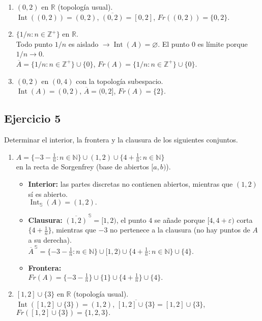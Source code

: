 \documentclass[12pt]{article}
\begin{document}
\begin{enumerate}
\item $(0,2)$ en $\mathbb{R}$ (topología usual).\\[4pt]
$\operatorname{Int}((0,2)) = (0,2)$, \quad 
$\overline{(0,2)} = [0,2]$, \quad 
$Fr((0,2)) = \{0,2\}.$

\item $\{1/n : n \in \mathbb{Z}^+\}$ en $\mathbb{R}$.\\[4pt]
Todo punto $1/n$ es aislado $\rightarrow \operatorname{Int}(A) = \varnothing$. 
El punto $0$ es límite porque $1/n \to 0$.\\
$\overline{A} = \{1/n : n \in \mathbb{Z}^+\} \cup \{0\}$, \quad
$Fr(A) = \{1/n : n \in \mathbb{Z}^+\} \cup \{0\}.$

\item $(0,2)$ en $(0,4)$ con la topología subespacio.\\[4pt]
$\operatorname{Int}(A) = (0,2)$, \quad
$\overline{A} = (0,2]$, \quad
$Fr(A) = \{2\}$.
\end{enumerate}

\subsection*{Ejercicio 5}
Determinar el interior, la frontera y la clausura de los siguientes conjuntos.

\begin{enumerate}
\item $A = \{-3-\tfrac{1}{n} : n\in\mathbb{N}\} \cup (1,2) \cup \{4+\tfrac{1}{n} : n\in\mathbb{N}\}$ \\
en la recta de Sorgenfrey (base de abiertos $[a,b)$).

\begin{itemize}
\item \textbf{Interior:} las partes discretas no contienen abiertos, mientras que $(1,2)$ sí es abierto.\\
$\operatorname{Int}_{\mathbb{S}}(A) = (1,2).$
\item \textbf{Clausura:} $\overline{(1,2)}^{\,\mathbb{S}} = [1,2)$, \quad 
el punto $4$ se añade porque $[4,4+\varepsilon)$ corta $\{4+\tfrac1n\}$, 
mientras que $-3$ no pertenece a la clausura (no hay puntos de $A$ a su derecha).\\[2pt]
$\displaystyle \overline{A}^{\,\mathbb{S}} = 
\{-3-\tfrac{1}{n} : n\in\mathbb{N}\} \cup [1,2) \cup 
\{4+\tfrac{1}{n} : n\in\mathbb{N}\} \cup \{4\}.$
\item \textbf{Frontera:}\\
$Fr(A) = \{-3-\tfrac{1}{n}\} \cup \{1\} \cup \{4+\tfrac{1}{n}\} \cup \{4\}.$
\end{itemize}

\item $[1,2]\cup\{3\}$ en $\mathbb{R}$ (topología usual).\\[4pt]
$\operatorname{Int}([1,2]\cup\{3\}) = (1,2)$, \quad 
$\overline{[1,2]\cup\{3\}} = [1,2]\cup\{3\}$, \quad 
$Fr([1,2]\cup\{3\}) = \{1,2,3\}.$
\end{enumerate}
\end{document}
